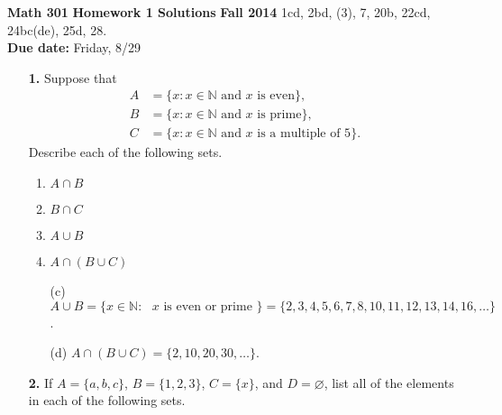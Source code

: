\documentclass[12pt,reqno]{amsart}
\newcommand{\N}{\ensuremath{\mathbb{N}}}
\renewcommand{\emptyset}{\ensuremath{\varnothing}}
\begin{document}
\thispagestyle{empty}

\noindent \textbf{Math 301} \hskip4cm {\bf Homework 1 Solutions} \hfill {\bf Fall 2014}
\vskip1cm
  1cd, 2bd, (3), 7, 20b, 22cd, 24bc(de), 25d, 28.  \\
{\bf Due date:} Friday, 8/29

\bigskip

\begin{enumerate}[{\bf 1.}]

\item[{\bf 1.}]
Suppose that
\begin{align*}
A & = \{ x : x \in \mathbb N \text{ and } x \text{ is even} \}, \\
B & = \{x : x \in \mathbb N \text{ and } x \text{ is prime}\}, \\
C & = \{ x : x \in \mathbb N \text{ and } x \text{ is a multiple of 5}\}.
\end{align*}
Describe each of the following sets. 
\begin{multicols}{2}
\begin{enumerate}

\item
$A \cap B$

\item
$B \cap C$

\item
$A \cup B$

\item
$A \cap (B \cup C)$

\end{enumerate}
\end{multicols}

\medskip


\medskip

\begin{enumerate}
\item[(c)] 
$A \cup B = \{x \in \N : \text{ $x$ is even or prime } \} = \{2, 3, 4,
5, 6, 7, 8, 10, 11, 12, 13, 14, 16, \dots \}$.

\medskip

\item[(d)]
$A \cap (B \cup C) = \{2, 10, 20, 30, \dots \}$.
\end{enumerate}

\bigskip  

\item[{\bf 2.}]
If $A = \{ a, b, c \}$, $B = \{ 1, 2, 3 \}$, $C = \{ x \}$, and 
$D = \emptyset$, list all of the elements in each of the following sets. 
\begin{multicols}{2}
\begin{enumerate}


\end{enumerate}
\end{multicols}
\end{enumerate}
\end{document}
